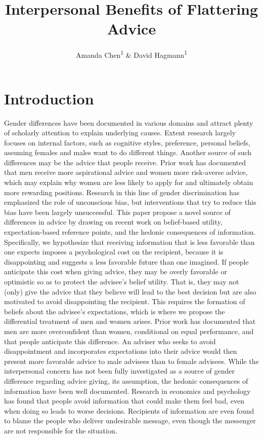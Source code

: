 \documentclass[
  man,floatsintext]{apa6}
\title{Interpersonal Benefits of Flattering Advice}
\author{Amanda Chen\textsuperscript{1} \& David Hagmann\textsuperscript{1}}
\date{}
\affiliation{\vspace{0.5cm}\textsuperscript{1} The Hong Kong University of Science and Technology}
\begin{document}
\maketitle

\hypertarget{introduction}{%
\section{Introduction}\label{introduction}}

Gender differences have been documented in various domains and attract plenty of scholarly attention to explain underlying causes. Extent research largely focuses on internal factors, such as cognitive styles, preference, personal beliefs, assuming females and males want to do different things. Another source of such differences may be the advice that people receive. Prior work has documented that men receive more aspirational advice and women more risk-averse advice, which may explain why women are less likely to apply for and ultimately obtain more rewarding positions. Research in this line of gender discrimination has emphasized the role of unconscious bias, but interventions that try to reduce this bias have been largely unsuccessful.
This paper propose a novel source of differences in advice by drawing on recent work on belief-based utility, expectation-based reference points, and the hedonic consequences of information. Specifically, we hypothesize that receiving information that is less favorable than one expects imposes a psychological cost on the recipient, because it is disappointing and suggests a less favorable future than one imagined. If people anticipate this cost when giving advice, they may be overly favorable or optimistic so as to protect the advisee's belief utility. That is, they may not (only) give the advice that they believe will lead to the best decision but are also motivated to avoid disappointing the recipient. This requires the formation of beliefs about the advisee's expectations, which is where we propose the differential treatment of men and women arises. Prior work has documented that men are more overconfident than women, conditional on equal performance, and that people anticipate this difference. An adviser who seeks to avoid disappointment and incorporates expectations into their advice would then present more favorable advice to male advisees than to female advisees.
While the interpersonal concern has not been fully investigated as a source of gender difference regarding advice giving, its assumption, the hedonic consequences of information have been well documented. Research in economics and psychology has found that people avoid information that could make them feel bad, even when doing so leads to worse decisions. Recipients of information are even found to blame the people who deliver undesirable message, even though the messenger are not responsible for the situation.
\end{document}
